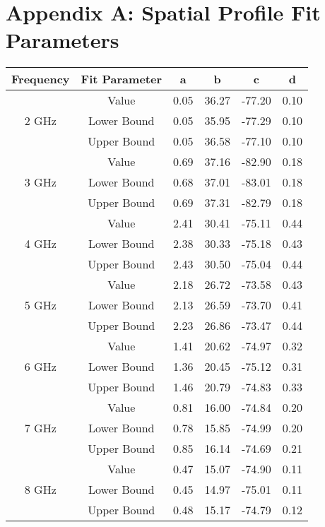 \chapter{Appendix A: Spatial Profile Fit Parameters}
{\tiny
\begin{center}
		\begin{tabular}{||c | c || c c c c||} 
			\hline
			Frequency & Fit Parameter & a & b & c & d \\ [0.5ex] 
			\hline\hline
			\multirow{3}{4em}{2 GHz} & Value & 0.05 & 36.27 & -77.20 & 0.10	 \\ 
			& Lower Bound & 0.05 & 35.95 & -77.29 & 0.10 \\ 
			& Upper Bound & 0.05 & 36.58 & -77.10 & 0.10 \\ 
			\hline
			\multirow{3}{4em}{3 GHz} & Value & 0.69 & 37.16 & -82.90 & 0.18  \\ 
			& Lower Bound & 0.68 & 37.01 & -83.01 & 0.18 \\ 
			& Upper Bound & 0.69 & 37.31 & -82.79 & 0.18 \\ 
			\hline
			\multirow{3}{4em}{4 GHz} & Value & 2.41 & 30.41 & -75.11 & 0.44 \\ 
			& Lower Bound & 2.38 & 30.33 & -75.18 & 0.43 \\ 
			& Upper Bound & 2.43 & 30.50 & -75.04 & 0.44 \\ 
			\hline
			\multirow{3}{4em}{5 GHz} & Value & 2.18 & 26.72 & -73.58 & 0.43 \\ 
			& Lower Bound & 2.13 & 26.59 & -73.70 & 0.41 \\ 
			& Upper Bound & 2.23 & 26.86 & -73.47 & 0.44 \\ 
			\hline
			\multirow{3}{4em}{6 GHz} & Value & 1.41 & 20.62 & -74.97 & 0.32 \\ 
			& Lower Bound & 1.36 & 20.45 & -75.12 & 0.31 \\ 
			& Upper Bound & 1.46 & 20.79 & -74.83 & 0.33 \\ 
			\hline
			\multirow{3}{4em}{7 GHz} & Value & 0.81 & 16.00 & -74.84 & 0.20 \\ 
			& Lower Bound & 0.78 & 15.85 & -74.99 & 0.20 \\ 
			& Upper Bound & 0.85 & 16.14 & -74.69 & 0.21 \\ 
			\hline
			\multirow{3}{4em}{8 GHz} & Value & 0.47 & 15.07 & -74.90 & 0.11 \\ 
			& Lower Bound & 0.45 & 14.97 & -75.01 & 0.11 \\ 
			& Upper Bound & 0.48 & 15.17 & -74.79 & 0.12 \\ 

\end{tabular}
\end{center}}
